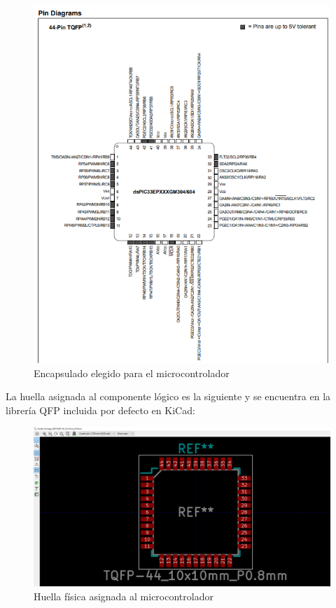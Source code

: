 \begin{figure}[H]
\centering 
\includegraphics[width=0.9\linewidth]{pictures/TQFP.PNG}
\caption{Encapsulado elegido para el microcontrolador}
\label{fig:kdiagram}
\end{figure}

La huella asignada al componente lógico es la siguiente y se encuentra en la librería QFP incluida por defecto en KiCad:

\begin{figure}[H]
\centering 
\includegraphics[width=0.9\linewidth]{pictures/HuellaPic.PNG}
\caption{Huella física asignada al microcontrolador}
\label{fig:kdiagram}
\end{figure}

